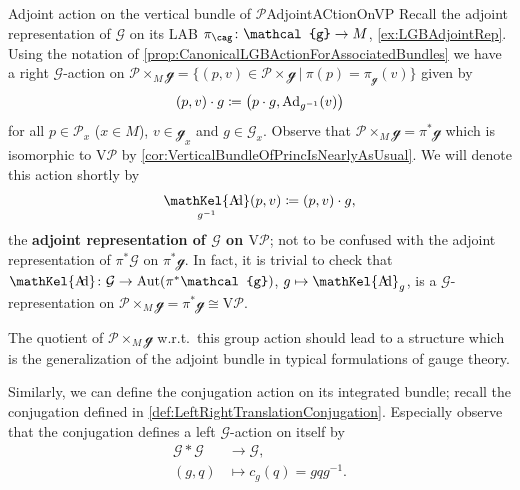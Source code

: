 \documentclass[reqno,a4paper,oneside]{amsart}
\theoremstyle{plain}
\theoremstyle{remark}
\theoremstyle{definition}
\DeclareMathOperator{\sAd}{\mathKel{A\mkern-5.5mu d}}
\begin{document}
\begin{examples}{Adjoint action on the vertical bundle of $\mathcal{P}$}{AdjointACtionOnVP}
Recall the adjoint representation of $\mathcal{G}$ on its LAB $\pi_\cag\colon\mathcal{g} \to M$, \ref{ex:LGBAdjointRep}. Using the notation of \ref{prop:CanonicalLGBActionForAssociatedBundles} we have a right $\mathcal{G}$-action on $\mathcal{P} \times_M \mathcal{g} = \{(p, v) \in \mathcal{P} \times \mathcal{g} ~ | ~ \pi(p) = \pi_{\mathcal{g}}(v) \}$ given by
\begin{equation*}
(p, v) \cdot g
\coloneqq
\mleft( p \cdot g, \mathrm{Ad}_{g^{-1}}(v) \mright)
\end{equation*}
for all $p \in \mathcal{P}_x$ ($x \in M$), $v \in \mathcal{g}_x$ and $g \in \mathcal{G}_x$. Observe that $\mathcal{P} \times_M \mathcal{g} = \pi^*\mathcal{g}$ which is isomorphic to $\mathrm{V}\mathcal{P}$ by \ref{cor:VerticalBundleOfPrincIsNearlyAsUsual}. We will denote this action shortly by
\begin{equation*}
\sAd_{g^{-1}}(p, v)
\coloneqq
(p,v) \cdot g,
\end{equation*}
the \textbf{adjoint representation of $\mathcal{G}$ on $\mathrm{V}\mathcal{P}$}; not to be confused with the adjoint representation of $\pi^*\mathcal{G}$ on $\pi^*\mathcal{g}$. In fact, it is trivial to check that $\sAd\colon \mathcal{G} \to \mathrm{Aut}(\pi^*\mathcal{g})$, $g \mapsto \sAd_{g}$, is a $\mathcal{G}$-representation on $\mathcal{P} \times_M \mathcal{g} = \pi^*\mathcal{g} \cong \mathrm{V}\mathcal{P}$.

The quotient of $\mathcal{P} \times_M \mathcal{g}$ w.r.t.\ this group action should lead to a structure which is the generalization of the adjoint bundle in typical formulations of gauge theory.
\end{examples}

Similarly, we can define the conjugation action on its integrated bundle; recall the conjugation defined in \ref{def:LeftRightTranslationConjugation}. Especially observe that the conjugation defines a left $\mathcal{G}$-action on itself by
\begin{align*}
\mathcal{G} * \mathcal{G} &\to \mathcal{G},\\
(g,q) &\mapsto c_g(q) = g q g^{-1}.
\end{align*}
\end{document}
